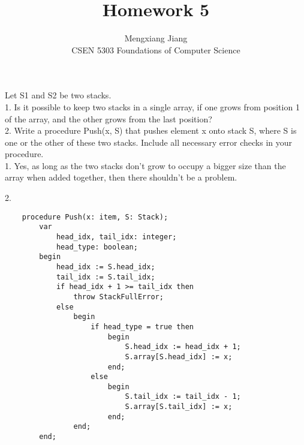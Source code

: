 \documentclass[12pt]{article}
\newenvironment{problem}[2][Problem]{\begin{trivlist}
\item[\hskip \labelsep {\bfseries #1}\hskip \labelsep {\bfseries #2.}]}{\end{trivlist}}
\begin{document}
 
 
\title{Homework 5}%
\author{Mengxiang Jiang\\ %
CSEN 5303 Foundations of Computer Science} %
 
\maketitle
 
\begin{problem}{1 (Stacks)} %
Let S1 and S2 be two stacks.\\
1. Is it possible to keep two stacks in a single array, if one grows from position 1 of the array, and the other grows from the last position? \\
2. Write a procedure Push(x, S) that pushes element x onto stack S, where S is one or the other of these two stacks. Include all necessary error checks in your procedure.\\

1. Yes, as long as the two stacks don't grow to occupy a bigger size than the array when added together, then there shouldn't be a problem.

2. \begin{verbatim}
    procedure Push(x: item, S: Stack);
        var
            head_idx, tail_idx: integer;
            head_type: boolean;
        begin
            head_idx := S.head_idx;
            tail_idx := S.tail_idx;
            if head_idx + 1 >= tail_idx then
                throw StackFullError;
            else
                begin
                    if head_type = true then
                        begin
                            S.head_idx := head_idx + 1;
                            S.array[S.head_idx] := x;
                        end;
                    else
                        begin
                            S.tail_idx := tail_idx - 1;
                            S.array[S.tail_idx] := x;
                        end;
                end;
        end;
\end{verbatim}

\end{problem}
\end{document}
